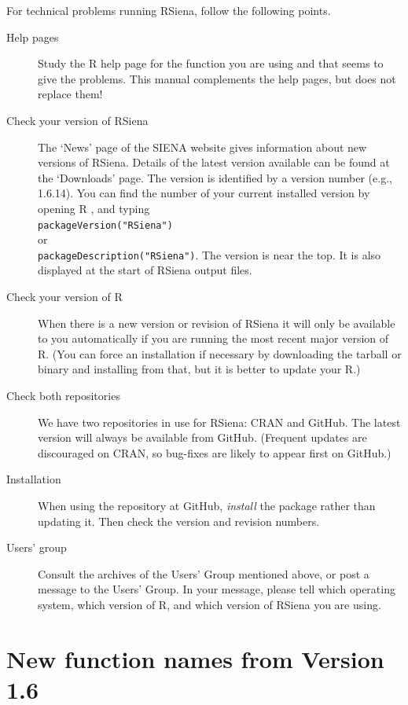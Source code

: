 \documentclass[a4paper,fleqn,11pt]{article}
\newcommand{\+}{\, + \,}
\newcommand{\R}{{\sf R }}
\newcommand{\Rn}{{\sf R}}
\newcommand{\rs}{{\sf RSiena}}
\newcommand{\RS}{{\sf \textsf{RSiena} }}
\newcommand{\SI}{{\sf SIENA }}
\begin{document}
For technical problems running \rs, follow the following points.
\begin{description}
\item[Help pages] Study the \R help page for the function you are using and that seems to give
      the problems. This manual complements the help pages,
      but does not replace them!
\item[Check your version of \RS]
  The `News' page of the \SI website gives information about new versions
  of \rs. Details of the latest version available can
  be found at the `Downloads' page.
  The version is
  identified by a version number (e.g., 1.6.14).
  You can find the number of your current installed version by
  opening \R, and typing\\
  \verb|packageVersion("RSiena")|   \\
  or \\
  \verb|packageDescription("RSiena")|. The version is
  near the top. It is also displayed at the
  start of \RS output files.
\item[Check your version of \Rn] When there is a new version or revision of \RS
  it will only be available to you automatically if you are running the most
  recent major version of \Rn. (You can force an installation if
  necessary by downloading the tarball or binary and installing from that, but
  it is better to update your \Rn.)
\item [Check both repositories] We have two repositories in use for \rs: CRAN
  and GitHub. The latest version will always be available from
  GitHub. (Frequent updates are discouraged on CRAN, so bug-fixes are likely to
  appear first on GitHub.)
\item[Installation] When using the repository at GitHub, \emph{install} the
  package rather than updating it. Then check the version and revision numbers.
\item[Users' group] Consult the archives of the Users' Group mentioned above, or post
     a message to the Users' Group. In your message,
     please tell which operating system, which version of \Rn, and which version
     of \RS you are using.
\end{description}

\newpage

\section{New function names from Version 1.6}
\label{S_names}
\end{document}
